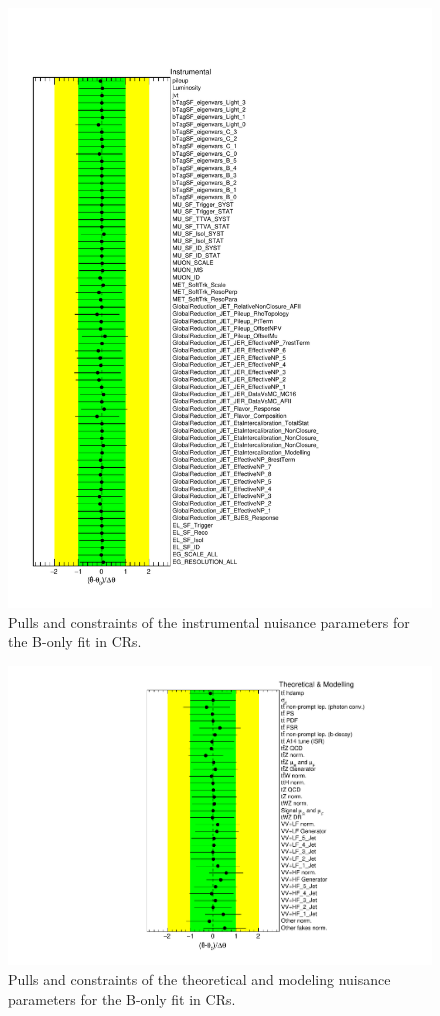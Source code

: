 \begin{figure}[htbp]
	\centering
	\includegraphics[width=.8\textwidth]{Chapters/CH7/figures/BONLY_CR_UsingDL1rcFullSys/NuisPar_Instrumental}
	\caption{Pulls and constraints of the instrumental nuisance parameters for the B-only \tZc fit in CRs.}%
	\label{fig:stat:tzc:bonly:cr:np:instr}
\end{figure}

\begin{figure}[htbp]
	\centering
	\includegraphics[width=.85\textwidth]{Chapters/CH7/figures/BONLY_CR_UsingDL1rcFullSys/NuisPar_Theoretical_&_Modelling}
	\caption{Pulls and constraints of the theoretical and modeling nuisance parameters for the B-only \tZc fit in CRs.}%
	\label{fig:stat:tzc:bonly:cr:np:model}
\end{figure}

